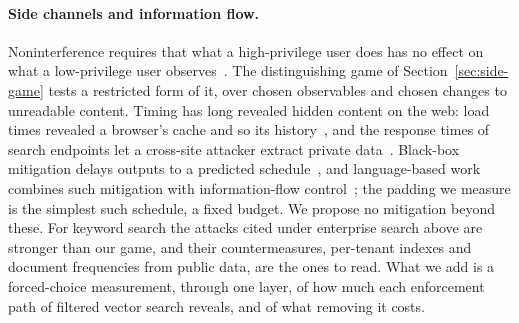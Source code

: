 \paragraph{Side channels and information flow.}
Noninterference requires that what a high-privilege user does has no effect on what a low-privilege
user observes~\cite{goguen1982security}. The distinguishing game of Section~\ref{sec:side-game} tests a
restricted form of it, over chosen observables and chosen changes to unreadable content. Timing has
long revealed hidden content on the web: load times revealed a browser's cache and so its
history~\cite{felten2000timing}, and the response times of search endpoints let a cross-site attacker
extract private data~\cite{gelernter2015crosssite}. Black-box mitigation delays outputs to a predicted
schedule~\cite{askarov2010predictive}, and language-based work combines such mitigation with
information-flow control~\cite{zhang2012languagebased}; the padding we measure is the simplest such
schedule, a fixed budget. We propose no mitigation beyond these. For keyword search the attacks cited under enterprise search above are stronger than our game, and their countermeasures, per-tenant indexes and document frequencies from public data, are the ones to read. What we add is a forced-choice measurement, through one layer, of how
much each enforcement path of filtered vector search reveals, and of what removing it costs.


